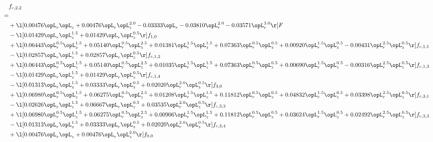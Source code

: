 \begin{alignat}{2} 
\label{eq:f_22_1} 
& f_{c,2,2} \nonumber \\ 
 = \\ 
& + \l[  0.00476 \opL_r \opL_z +  0.00476 \opL_r \opL_z^{2.0}   -0.03333 \opL_r   -0.03810 \opL_r^{2.0}   -0.03571 \opL_r^{3.0}  \r] F \nonumber \\ 
& - \l[  0.01429 \opL_r \opL_z^{1.5} +  0.01429 \opL_r \opL_z^{0.5}  \r] f_{1,0} \nonumber \\ 
& + \l[  0.06443 \opL_r^{0.5} \opL_z^{1.5} +  0.05140 \opL_r^{0.5} \opL_z^{2.5} +  0.01381 \opL_r^{1.5} \opL_z^{1.5} +  0.07363 \opL_r^{0.5} \opL_z^{0.5} +  0.00920 \opL_r^{1.5} \opL_z^{0.5}   -0.00431 \opL_r^{2.5} \opL_z^{0.5}  \r] f_{c,1,1} \nonumber \\ 
& - \l[  0.02857 \opL_r \opL_z^{1.5} +  0.02857 \opL_r \opL_z^{0.5}  \r] f_{c,1,2} \nonumber \\ 
& + \l[  0.06443 \opL_r^{0.5} \opL_z^{1.5} +  0.05140 \opL_r^{0.5} \opL_z^{2.5} +  0.01035 \opL_r^{1.5} \opL_z^{1.5} +  0.07363 \opL_r^{0.5} \opL_z^{0.5} +  0.00690 \opL_r^{1.5} \opL_z^{0.5}   -0.00316 \opL_r^{2.5} \opL_z^{0.5}  \r] f_{c,1,3} \nonumber \\ 
& - \l[  0.01429 \opL_r \opL_z^{1.5} +  0.01429 \opL_r \opL_z^{0.5}  \r] f_{c,1,4} \nonumber \\ 
& - \l[  0.01313 \opL_r \opL_z^{1.5} +  0.03333 \opL_r \opL_z^{0.5} +  0.02020 \opL_r^{2.0} \opL_z^{0.5}  \r] f_{3,0} \nonumber \\ 
& + \l[  0.06980 \opL_r^{0.5} \opL_z^{1.5} +  0.06275 \opL_r^{0.5} \opL_z^{2.5} +  0.01208 \opL_r^{1.5} \opL_z^{1.5} +  0.11812 \opL_r^{0.5} \opL_z^{0.5} +  0.04832 \opL_r^{1.5} \opL_z^{0.5} +  0.03398 \opL_r^{2.5} \opL_z^{0.5}  \r] f_{c,3,1} \nonumber \\ 
& - \l[  0.02626 \opL_r \opL_z^{1.5} +  0.06667 \opL_r \opL_z^{0.5} +  0.03535 \opL_r^{2.0} \opL_z^{0.5}  \r] f_{c,3,2} \nonumber \\ 
& + \l[  0.06980 \opL_r^{0.5} \opL_z^{1.5} +  0.06275 \opL_r^{0.5} \opL_z^{2.5} +  0.00906 \opL_r^{1.5} \opL_z^{1.5} +  0.11812 \opL_r^{0.5} \opL_z^{0.5} +  0.03624 \opL_r^{1.5} \opL_z^{0.5} +  0.02492 \opL_r^{2.5} \opL_z^{0.5}  \r] f_{c,3,3} \nonumber \\ 
& - \l[  0.01313 \opL_r \opL_z^{1.5} +  0.03333 \opL_r \opL_z^{0.5} +  0.02020 \opL_r^{2.0} \opL_z^{0.5}  \r] f_{c,3,4} \nonumber \\ 
& + \l[  0.00476 \opL_r \opL_z +  0.00476 \opL_r \opL_z^{2.0}  \r] f_{0,0} \nonumber \\ 

\end{alignat}

